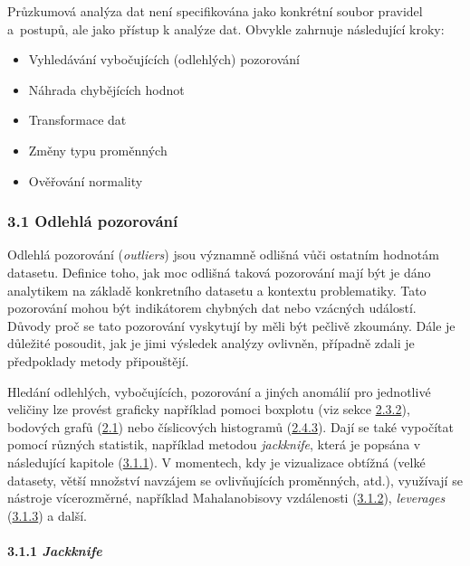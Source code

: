 \documentclass[12pt,]{article}
\providecommand{\tightlist}{%
  \setlength{\itemsep}{0pt}\setlength{\parskip}{0pt}}
\let\oldparagraph\paragraph
\renewcommand{\paragraph}[1]{\oldparagraph{#1}\mbox{}}
\begin{document}
\qquad Průzkumová analýza dat není specifikována jako konkrétní soubor
pravidel a~postupů, ale jako přístup k analýze dat. Obvykle zahrnuje
následující kroky:

\begin{itemize}
\tightlist
\item
  Vyhledávání vybočujících (odlehlých) pozorování
\item
  Náhrada chybějících hodnot
\item
  Transformace dat
\item
  Změny typu proměnných
\item
  Ověřování normality
\end{itemize}

\subsubsection{3.1 Odlehlá pozorování}\label{odlehla-pozorovani}

\qquad Odlehlá pozorování (\emph{outliers}) jsou významně odlišná vůči
ostatním hodnotám datasetu. Definice toho, jak moc odlišná taková
pozorování mají být je dáno analytikem na základě konkretního datasetu a
kontextu problematiky. Tato pozorování mohou být indikátorem chybných
dat nebo vzácných událostí. Důvody proč se tato pozorování vyskytují by
měli být pečlivě zkoumány. Dále je důležité posoudit, jak je jimi
výsledek analýzy ovlivněn, případně zdali je předpoklady metody
připouštějí.

\qquad Hledání odlehlých, vybočujících, pozorování a jiných anomálií pro
jednotlivé veličiny lze provést graficky například pomoci boxplotu (viz
sekce \protect\hyperlink{boxplot}{2.3.2}), bodových grafů
(\protect\hyperlink{scatterplot}{2.1}) nebo číslicových histogramů
(\protect\hyperlink{stem-and-leaf}{2.4.3}). Dají se také vypočítat
pomocí různých statistik, například metodou \emph{jackknife}, která je
popsána v následující kapitole (\protect\hyperlink{jackknife}{3.1.1}). V
momentech, kdy je vizualizace obtížná (velké datasety, větší množství
navzájem se ovlivňujících proměnných, atd.), využívají se nástroje
vícerozměrné, například Mahalanobisovy vzdálenosti
(\protect\hyperlink{mbdist}{3.1.2}), \emph{leverages}
(\protect\hyperlink{leverages}{3.1.3}) a další.

\hypertarget{jackknife}{\paragraph{\texorpdfstring{3.1.1
\emph{Jackknife}}{3.1.1 Jackknife}}\label{jackknife}}
\end{document}
